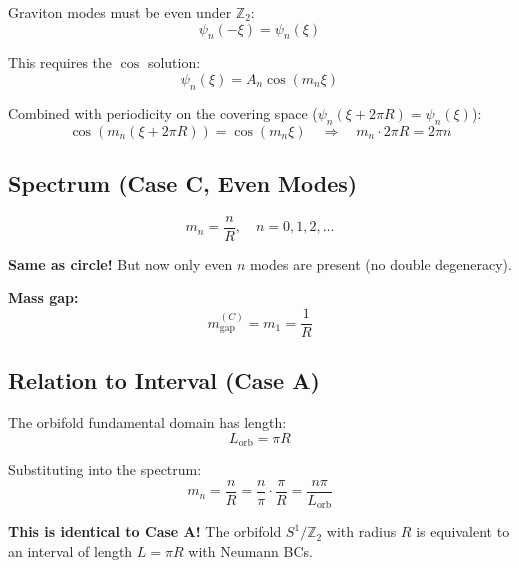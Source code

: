 \documentclass[11pt,a4paper]{article}
\newcommand{\mgap}{m_{\mathrm{gap}}}
\begin{document}
Graviton modes must be even under $\mathbb{Z}_2$:
\begin{equation}
\psi_n(-\xi) = \psi_n(\xi)
\label{eq:caseC-even}
\end{equation}

This requires the $\cos$ solution:
\begin{equation}
\psi_n(\xi) = A_n \cos(m_n \xi)
\label{eq:caseC-cos}
\end{equation}

Combined with periodicity on the covering space ($\psi_n(\xi + 2\pi R) = \psi_n(\xi)$):
\begin{equation}
\cos(m_n(\xi + 2\pi R)) = \cos(m_n \xi) \quad \Rightarrow \quad m_n \cdot 2\pi R = 2\pi n
\label{eq:caseC-periodicity}
\end{equation}

\subsection{Spectrum (Case C, Even Modes)}

\begin{equation}
\boxed{m_n = \frac{n}{R}, \quad n = 0, 1, 2, \ldots}
\label{eq:spectrum-C}
\end{equation}

\textbf{Same as circle!} But now only even $n$ modes are present (no double degeneracy).

\textbf{Mass gap:}
\begin{equation}
\mgap^{(C)} = m_1 = \frac{1}{R}
\label{eq:mgap-C}
\end{equation}

\subsection{Relation to Interval (Case A)}

The orbifold fundamental domain has length:
\begin{equation}
L_{\mathrm{orb}} = \pi R
\label{eq:Lorb}
\end{equation}

Substituting into the spectrum:
\begin{equation}
m_n = \frac{n}{R} = \frac{n}{\pi} \cdot \frac{\pi}{R} = \frac{n\pi}{L_{\mathrm{orb}}}
\label{eq:spectrum-C-interval}
\end{equation}

\textbf{This is identical to Case A!} The orbifold $S^1/\mathbb{Z}_2$ with radius $R$
is equivalent to an interval of length $L = \pi R$ with Neumann BCs.
\end{document}
